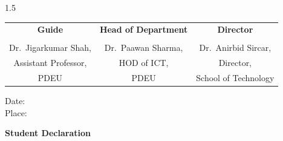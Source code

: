 \begin{spacing}{1.5}
\begin{center}
\begin{tabular}{ccc}
    \textbf{Guide} &
    \textbf{Head of Department} &
    \textbf{Director} \\[1.2cm]

    \underline{\hspace{4cm}} &
    \underline{\hspace{4cm}} &
    \underline{\hspace{4cm}} \\[0.3cm]

    Dr.\ Jigarkumar Shah, &
    Dr.\ Paawan Sharma, &
    Dr.\ Anirbid Sircar, \\

    Assistant Professor, &
    HOD of ICT, &
    Director, \\

    PDEU &
    PDEU &
    School of Technology \\

    \end{tabular}

    \vspace{2cm}

    \end{center}

    \end{spacing}
    \vfill
    \begin{flushleft}
        Date: \makebox[1.8in]{\hrulefill}\\
        Place: \makebox[1.8in]{\hrulefill}\\
    \end{flushleft}
    \newpage
    \thispagestyle{empty}
    \begin{center}
	    \textbf{\large Student Declaration}
    \end{center}

